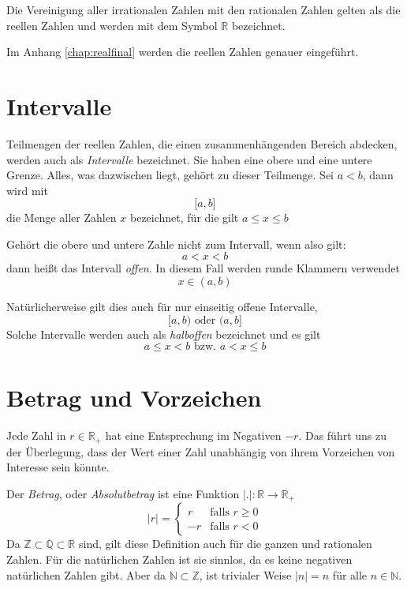 Die Vereinigung aller irrationalen Zahlen mit den rationalen Zahlen gelten als die reellen Zahlen und werden mit dem Symbol $\mathbb{R}$ bezeichnet.

Im Anhang \ref{chap:realfinal} werden die reellen Zahlen genauer eingeführt. 

\section{Intervalle}

\begin{definition}
Teilmengen der reellen Zahlen, die einen zusammenhängenden Bereich abdecken, werden auch als \emph{Intervalle} bezeichnet. Sie haben eine obere und eine untere Grenze. Alles, was dazwischen liegt, gehört zu dieser Teilmenge. Sei $a<b$, dann wird mit
\[
\lbrack a,b \rbrack
\]
die Menge aller Zahlen $x$ bezeichnet, für die gilt $a\le x\le b$
\end{definition}

\begin{definition}
Gehört die obere und untere Zahle nicht zum Intervall, wenn also gilt:
\[
a<x<b
\]
dann heißt das Intervall \emph{offen}. In diesem Fall werden runde Klammern verwendet
\[
x\in (a,b)
\]
\end{definition}

\begin{definition}
Natürlicherweise gilt dies auch für nur einseitig offene Intervalle, 
\[
\lbrack a,b) \text{ oder } (a,b\rbrack
\]
Solche Intervalle werden auch als \emph{halboffen} bezeichnet und es gilt
\[
a\le x <b \text{ bzw. } a<x \le b
\]
\end{definition}

\section{Betrag und Vorzeichen}

Jede Zahl in $r\in \mathbb{R}_+$ hat eine Entsprechung im Negativen $-r$. Das führt uns zu der Überlegung, dass der Wert einer Zahl unabhängig von ihrem Vorzeichen von Interesse sein könnte.

\begin{definition}
Der \emph{Betrag}, oder \emph{Absolutbetrag} ist eine Funktion $\vert . \vert : \mathbb{R} \longrightarrow \mathbb{R}_+$
\begin{equation}
\vert r \vert = \begin{cases}
r & \text{falls } r\ge 0 \\
-r & \text{falls } r<0
\end{cases}
\end{equation}
Da $\mathbb{Z} \subset \mathbb{Q} \subset \mathbb{R}$ sind, gilt diese Definition auch für die ganzen und rationalen Zahlen. Für die natürlichen Zahlen ist sie sinnlos, da es keine negativen natürlichen Zahlen gibt. Aber da $\mathbb{N} \subset \mathbb{Z}$, ist trivialer Weise $\vert n \vert = n$ für alle $n\in \mathbb{N}$.
\end{definition}

